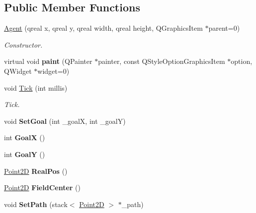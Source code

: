 \subsection*{Public Member Functions}
\begin{DoxyCompactItemize}
\item 
\hyperlink{class_agent_ae94d885a5f3900b0b67927710945ba26}{Agent} (qreal x, qreal y, qreal width, qreal height, Q\-Graphics\-Item $\ast$parent=0)
\begin{DoxyCompactList}\small\item\em Constructor. \end{DoxyCompactList}\item 
\hypertarget{class_agent_affa8c88292795f1f07e7ac74ef50cb6f}{virtual void {\bfseries paint} (Q\-Painter $\ast$painter, const Q\-Style\-Option\-Graphics\-Item $\ast$option, Q\-Widget $\ast$widget=0)}\label{class_agent_affa8c88292795f1f07e7ac74ef50cb6f}

\item 
void \hyperlink{class_agent_a6a9ff6b09b8a66177a90f0172c72a884}{Tick} (int millis)
\begin{DoxyCompactList}\small\item\em Tick. \end{DoxyCompactList}\item 
\hypertarget{class_agent_af388a0b175ceda73e1834e399f6f98e9}{void {\bfseries Set\-Goal} (int \-\_\-goal\-X, int \-\_\-goal\-Y)}\label{class_agent_af388a0b175ceda73e1834e399f6f98e9}

\item 
\hypertarget{class_agent_a3037f3d0b54aaf8272c176c26d096c26}{int {\bfseries Goal\-X} ()}\label{class_agent_a3037f3d0b54aaf8272c176c26d096c26}

\item 
\hypertarget{class_agent_a0a87900958ea46f2e15df2c9f42e976e}{int {\bfseries Goal\-Y} ()}\label{class_agent_a0a87900958ea46f2e15df2c9f42e976e}

\item 
\hypertarget{class_agent_acfbcafe677bc8810fac4f8311e0d9c3f}{\hyperlink{class_point2_d}{Point2\-D} {\bfseries Real\-Pos} ()}\label{class_agent_acfbcafe677bc8810fac4f8311e0d9c3f}

\item 
\hypertarget{class_agent_ad886fc8c1e03592b23296cd82d8b0dbb}{\hyperlink{class_point2_d}{Point2\-D} {\bfseries Field\-Center} ()}\label{class_agent_ad886fc8c1e03592b23296cd82d8b0dbb}

\item 
\hypertarget{class_agent_a610a51c9fd807c1d75107409f1a6a8e0}{void {\bfseries Set\-Path} (stack$<$ \hyperlink{class_point2_d}{Point2\-D} $>$ $\ast$\-\_\-path)}\label{class_agent_a610a51c9fd807c1d75107409f1a6a8e0}

\end{DoxyCompactItemize}


